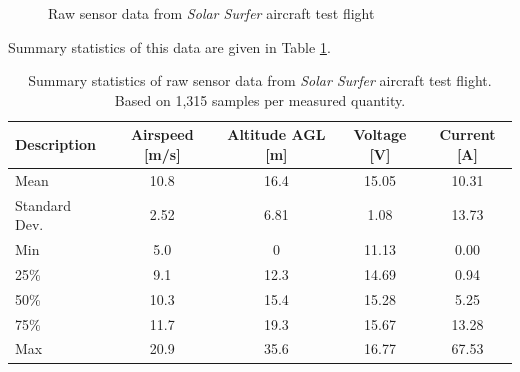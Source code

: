 \begin{figure}[H]
    \centering
    \caption{Raw sensor data from \emph{Solar Surfer} aircraft test flight}
    \label{fig:raw_flight_data}
\end{figure}

Summary statistics of this data are given in Table \ref{tab:aircraft_stats}.

\begin{table}[H]
    \centering
    \caption{Summary statistics of raw sensor data from \emph{Solar Surfer} aircraft test flight. Based on 1,315 samples per measured quantity.}
    \begin{tabular}{lcccc}
        \toprule
        Description   & Airspeed [m/s] & Altitude AGL [m] & Voltage [V] & Current [A] \\ \midrule
        Mean          & 10.8           & 16.4             & 15.05       & 10.31       \\
        Standard Dev. & 2.52           & 6.81             & 1.08        & 13.73       \\
        Min           & 5.0            & 0                & 11.13       & 0.00        \\
        25\%          & 9.1            & 12.3             & 14.69       & 0.94        \\
        50\%          & 10.3           & 15.4             & 15.28       & 5.25        \\
        75\%          & 11.7           & 19.3             & 15.67       & 13.28       \\
        Max           & 20.9           & 35.6             & 16.77       & 67.53       \\ \bottomrule
    \end{tabular}
    \label{tab:aircraft_stats}
\end{table}

